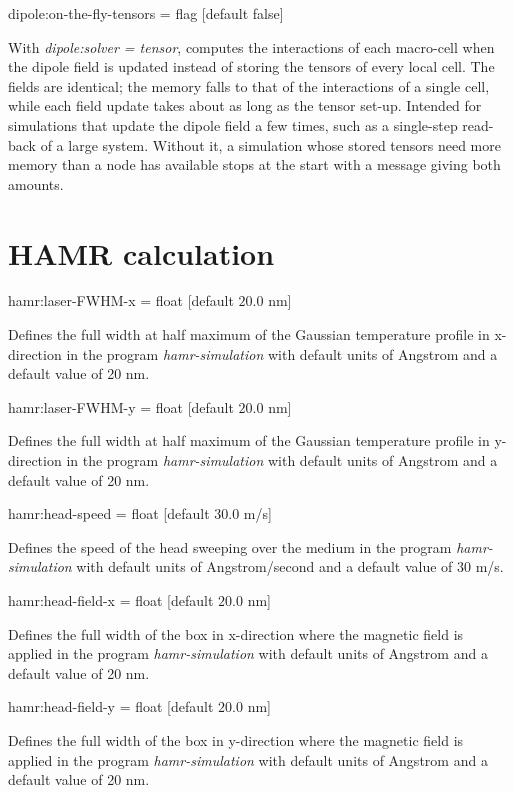 {\zicf dipole:on-the-fly-tensors = flag [default false]} With \textit{dipole:solver = tensor}, computes the interactions of each macro-cell when the dipole field is updated instead of storing the tensors of every local cell. The fields are identical; the memory falls to that of the interactions of a single cell, while each field update takes about as long as the tensor set-up. Intended for simulations that update the dipole field a few times, such as a single-step read-back of a large system. Without it, a simulation whose stored tensors need more memory than a node has available stops at the start with a message giving both amounts.

\section*{HAMR calculation}
{\zicf hamr:laser-FWHM-x = float [default $20.0$ nm]}
Defines the full width at half maximum of the Gaussian temperature profile in x-direction
in the program \textit{hamr-simulation} with default units of Angstrom and a default value of 20 nm.

{\zicf hamr:laser-FWHM-y = float [default $20.0$ nm]}
Defines the full width at half maximum of the Gaussian temperature profile in y-direction
in the program \textit{hamr-simulation} with default units of Angstrom and a default value of 20 nm.

{\zicf hamr:head-speed = float [default $30.0$ m/s]}
Defines the speed of the head sweeping over the medium
in the program \textit{hamr-simulation} with default units of Angstrom/second and a default value of 30 m/s.

{\zicf hamr:head-field-x = float [default $20.0$ nm]}
Defines the full width of the box in x-direction where the magnetic field is applied
in the program \textit{hamr-simulation} with default units of Angstrom and a default value of 20 nm.

{\zicf hamr:head-field-y = float [default $20.0$ nm]}
Defines the full width of the box in y-direction where the magnetic field is applied
in the program \textit{hamr-simulation} with default units of Angstrom and a default value of 20 nm.

